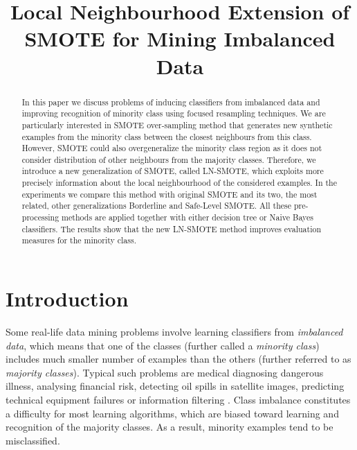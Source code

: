\documentclass[conference]{IEEEtran}
\begin{document}
\title{Local Neighbourhood Extension of SMOTE for Mining Imbalanced Data}

\author{
}

\maketitle

\begin{abstract}
In this paper we discuss problems of inducing classifiers
from imbalanced data and improving recognition of minority class
using focused resampling techniques. We are particularly interested in SMOTE over-sampling method that generates new synthetic examples from the minority class  between the closest neighbours from this class.  However, SMOTE could  also overgeneralize the minority class region as it does not consider distribution of other neighbours from the majority classes. Therefore, we introduce a new generalization of SMOTE, called LN-SMOTE, which exploits more precisely information about the local neighbourhood of the considered examples.  In the experiments we compare this method with original SMOTE and its two, the most related, other generalizations Borderline and Safe-Level SMOTE.  All these pre-processing methods are applied together with either decision tree or Naive Bayes classifiers. The results show that the new LN-SMOTE method improves evaluation measures for the minority class.
\end{abstract}

\section{Introduction}

Some real-life data mining problems involve learning classifiers from {\em
imbalanced data}, which means that one of the classes (further called a {\em
minority class}) includes much smaller number of examples than the others
(further referred to as \emph{majority classes}).  Typical such problems are
medical diagnosing dangerous illness, analysing financial
risk, detecting oil spills in satellite images, predicting technical
equipment failures or information filtering \cite{Smote,HeGarcia}.
Class imbalance constitutes a difficulty for most learning algorithms, which
 are biased toward learning and recognition of the majority classes. As a result, minority examples tend to
be misclassified.
\end{document}
